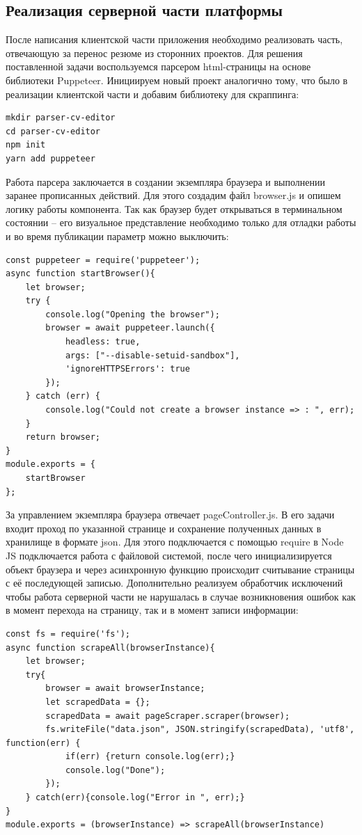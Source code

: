 \documentclass[master, och, diploma]{SCWorks}
\begin{document}
\subsection{Реализация серверной части платформы}
После написания клиентской части приложения необходимо реализовать часть, отвечающую за перенос резюме из сторонних проектов. Для решения поставленной задачи воспользуемся парсером html-страницы на основе библиотеки Puppeteer. Инициируем новый проект аналогично тому, что было в реализации клиентской части и добавим библиотеку для скраппинга:
\begin{verbatim}
mkdir parser-cv-editor
cd parser-cv-editor
npm init
yarn add puppeteer
\end{verbatim}

Работа парсера заключается в создании экземпляра браузера и выполнении заранее прописанных действий. Для этого создадим файл browser.js и опишем логику работы компонента. Так как браузер будет открываться в терминальном состоянии – его визуальное представление необходимо только для отладки работы и во время публикации параметр можно выключить:
\begin{verbatim}
const puppeteer = require('puppeteer');
async function startBrowser(){
	let browser;
	try {
	    console.log("Opening the browser");
	    browser = await puppeteer.launch({
	        headless: true,
	        args: ["--disable-setuid-sandbox"],
	        'ignoreHTTPSErrors': true
	    });
	} catch (err) {
	    console.log("Could not create a browser instance => : ", err);
	}
	return browser;
}
module.exports = {
	startBrowser
};
\end{verbatim}

За управлением экземпляра браузера отвечает pageController.js. В его задачи входит проход по указанной странице и сохранение полученных данных в хранилище в формате json. Для этого подключается с помощью require в Node JS подключается работа с файловой системой, после чего инициализируется объект браузера и через асинхронную функцию происходит считывание страницы с её последующей записью. Дополнительно реализуем обработчик исключений чтобы работа серверной части не нарушалась в случае возникновения ошибок как в момент перехода на страницу, так и в момент записи информации:
\begin{verbatim}
const fs = require('fs');
async function scrapeAll(browserInstance){
    let browser;
	try{
	    browser = await browserInstance;
	    let scrapedData = {};
	    scrapedData = await pageScraper.scraper(browser);
	    fs.writeFile("data.json", JSON.stringify(scrapedData), 'utf8', function(err) {
		    if(err) {return console.log(err);}
		    console.log("Done");
	    });
    } catch(err){console.log("Error in ", err);}
}
module.exports = (browserInstance) => scrapeAll(browserInstance)
\end{verbatim}
\end{document}
